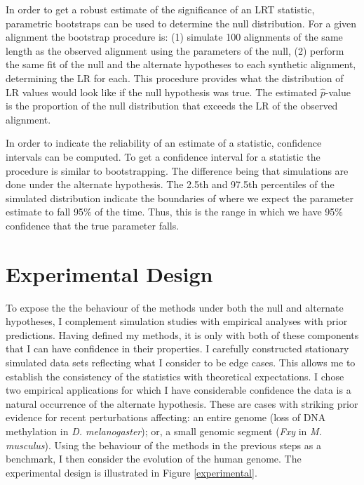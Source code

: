 In order to get a robust estimate of the significance of an LRT statistic, parametric bootstraps can be used to determine the null distribution. For a given alignment the bootstrap procedure is: 
(1) simulate 100 alignments of the same length as the observed alignment using the parameters of the null, 
(2) perform the same fit of the null and the alternate hypotheses to each synthetic alignment, determining the LR for each.  
This procedure provides what the distribution of LR values would look like if the null hypothesis was true. The estimated $\hat p$-value is the proportion of the null distribution that exceeds the LR of the observed alignment. 

In order to indicate the reliability of an estimate of a statistic, confidence intervals can be computed. To get a confidence interval for a statistic the procedure is similar to bootstrapping. The difference being that simulations are done under the alternate hypothesis. The 2.5th and 97.5th percentiles of the simulated distribution indicate the boundaries of where we expect the parameter estimate to fall 95\% of the time. Thus, this is the range in which we have 95\% confidence that the true parameter falls. 

\section{Experimental Design}

To expose the the behaviour of the methods under both the null and alternate hypotheses, I complement  simulation studies with empirical analyses with prior predictions. Having defined my methods, it is only with both of these components that I can have confidence in their properties. I carefully constructed stationary simulated data sets reflecting what I consider to be edge cases. This allows me to establish the consistency of the statistics with theoretical expectations. I chose two empirical applications for which I have considerable confidence the data is a natural occurrence of the alternate hypothesis. These are cases with striking prior evidence for recent perturbations affecting: an entire genome (loss of DNA methylation in \textit{D. melanogaster}); or, a small genomic segment (\textit{Fxy} in \textit{M. musculus}). Using the behaviour of the methods in the previous steps as a benchmark, I then consider the evolution of the human genome. The experimental design is illustrated in Figure \ref{experimental}. 



